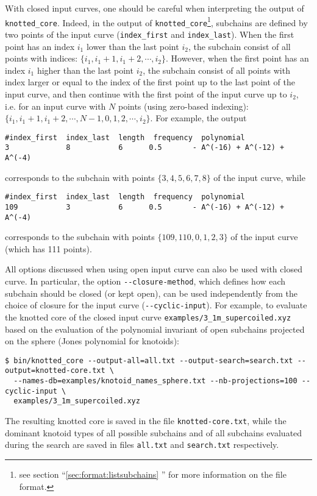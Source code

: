 With closed input curves, one should be careful when interpreting the output of \lstinline{knotted_core}. Indeed, in the output of \lstinline{knotted_core}\footnote{see section ``\ref{sec:format:listsubchains} '' for more information on the file format.}, subchains are defined by two points of the input curve (\lstinline{index_first} and \lstinline{index_last}). When the first point has an index $i_1$ lower than the last point $i_2$, the subchain consist of all points with indices: $\{i_1,i_1+1,i_1+2,\cdots,i_2\}$.
However, when the first point has an index $i_1$ higher than the last point $i_2$, the subchain consist of all points with index larger or equal to the index of the first point up to the last point of the input curve, and then continue with the first point of the input curve up to $i_2$, i.e. for an input curve with $N$ points (using zero-based indexing): $\{i_1,i_1+1,i_1+2,\cdots,N-1,0,1,2,\cdots,i_2\}$. For example, the output
\begin{lstlisting}
#index_first  index_last  length  frequency  polynomial
3             8           6      0.5       - A^(-16) + A^(-12) + A^(-4)
\end{lstlisting}
corresponds to the subchain with points $\{3,4,5,6,7,8\}$ of the input curve, while 
\begin{lstlisting}
#index_first  index_last  length  frequency  polynomial
109           3           6      0.5       - A^(-16) + A^(-12) + A^(-4)
\end{lstlisting}
corresponds to the subchain with points $\{109,110,0,1,2,3\}$ of the input curve (which has 111 points).

All options discussed when using open input curve can also be used with closed curve. In particular, the option \lstinline{--closure-method}, which defines how each subchain should be closed (or kept open), can be used independently from the choice of closure for the input curve (\lstinline{--cyclic-input}). For example, to evaluate the knotted core of the closed input curve \lstinline{examples/3_1m_supercoiled.xyz} based on the evaluation of the polynomial invariant of open subchains projected on the sphere (Jones polynomial for knotoids):
\begin{lstlisting}
$ bin/knotted_core --output-all=all.txt --output-search=search.txt --output=knotted-core.txt \
  --names-db=examples/knotoid_names_sphere.txt --nb-projections=100 --cyclic-input \
  examples/3_1m_supercoiled.xyz
\end{lstlisting}
The resulting knotted core is saved in the file \lstinline{knotted-core.txt}, while the dominant knotoid types of all possible subchains and of all subchains evaluated during the search are saved in files \lstinline{all.txt} and \lstinline{search.txt} respectively.


